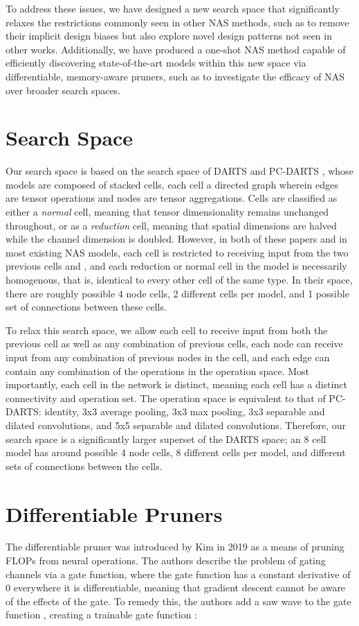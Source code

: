 \documentclass[10pt,twocolumn,letterpaper]{article}
\begin{document}
To address these issues, we have designed a new search space that significantly relaxes the restrictions commonly seen in other NAS methods, such as to remove their implicit design biases but also explore novel design patterns not seen in other works.  Additionally, we have produced a one-shot NAS method capable of efficiently discovering state-of-the-art models within this new space via differentiable, memory-aware pruners, such as to investigate the efficacy of NAS over broader search spaces. 
 
\section{Search Space}
Our search space is based on the search space of DARTS \cite{liu2019} and PC-DARTS \cite{xu2020}, whose models are composed of stacked cells, each cell a directed graph wherein edges are tensor operations and nodes are tensor aggregations. Cells are classified as either a \textit{normal} cell, meaning that tensor dimensionality remains unchanged throughout, or as a \textit{reduction} cell, meaning that spatial dimensions are halved while the channel dimension is doubled. However, in both of these papers and in most existing NAS models, each cell  is restricted to receiving input from the two previous cells  and , and each reduction or normal cell in the model is necessarily homogenous, that is, identical to every other cell of the same type. In their space, there are roughly  possible 4 node cells, 2 different cells per model, and 1 possible set of connections between these cells.

To relax this search space, we allow each cell to receive input from both the previous cell as well as any combination of previous cells, each node can receive input from any combination of previous nodes in the cell, and each edge can contain any combination of the operations in the operation space. Most importantly, each cell in the network is distinct, meaning each cell has a distinct connectivity and operation set. The operation space is equivalent to that of PC-DARTS: identity, 3x3 average pooling, 3x3 max pooling, 3x3 separable and dilated convolutions, and 5x5 separable and dilated convolutions. Therefore, our search space is a significantly larger superset of the DARTS space; an 8 cell model has around  possible 4 node cells, 8 different cells per model, and  different sets of connections between the cells.

\section{Differentiable Pruners}
The differentiable pruner was introduced by Kim \etal \cite{kim2019} in 2019 as a means of pruning FLOPs from neural operations. The authors describe the problem of gating channels via a gate function, where the gate function has a constant derivative of 0 everywhere it is differentiable, meaning that gradient descent cannot be aware of the effects of the gate. To remedy this, the authors add a saw wave  to the gate function , creating a trainable gate function :
\end{document}

